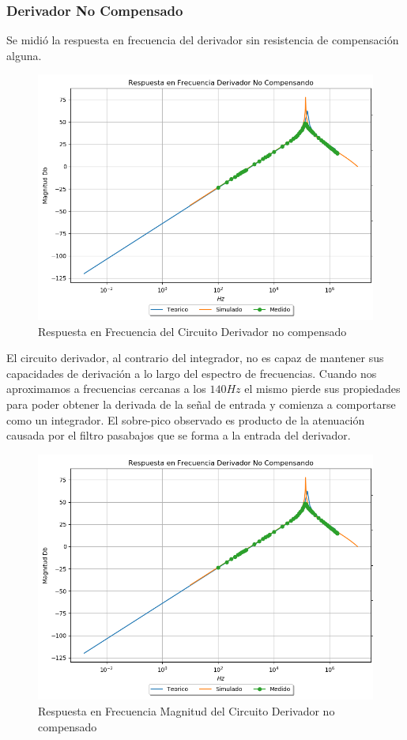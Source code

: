 \documentclass[a4paper]{article}
\begin{document}
\subsubsection{Derivador No Compensado}
Se midió la respuesta en frecuencia del derivador sin resistencia de compensación alguna.
\begin{figure}[H]
	\centering
	\includegraphics[width=\textwidth]{Ejercicio4/SUPERPOSICION-BODE-DERIVADOR-NO-COMPENSADO}
	\caption{Respuesta en Frecuencia del Circuito Derivador no compensado}
\end{figure}
El circuito derivador, al contrario del integrador, no es capaz de mantener sus capacidades de derivación a lo largo del espectro de frecuencias. Cuando nos aproximamos a frecuencias cercanas a los $140Hz$ el mismo pierde sus propiedades para poder obtener la derivada de la señal de entrada y comienza a comportarse como un integrador. 
El sobre-pico observado es producto de la atenuación causada por el filtro pasabajos que se forma a la entrada del derivador.


\begin{figure}[H]
	\centering
	\includegraphics[width=\textwidth]{Ejercicio4/SUPERPOSICION-BODE-DERIVADOR-NO-COMPENSADO}
	\caption{Respuesta en Frecuencia Magnitud del Circuito Derivador no compensado}
\end{figure}
\end{document}
